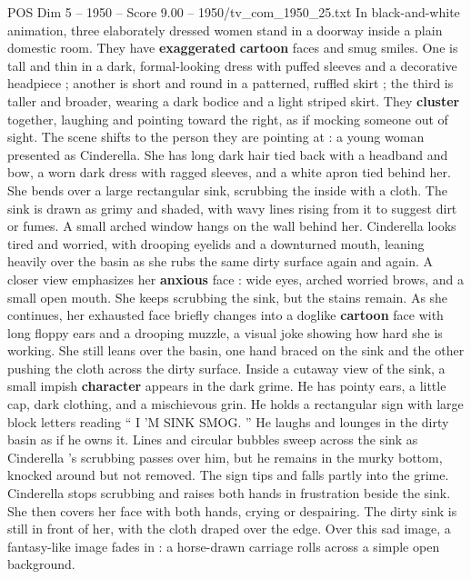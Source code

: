 \begin{textsample}{POS Dim 5 – 1950 – Score 9.00 – 1950/tv\_com\_1950\_25.txt}  \label{ex:f5_pos_071}
In black-and-white animation, three elaborately dressed women stand in a doorway inside a plain domestic room.
They have \textbf{exaggerated} \textbf{cartoon} faces and smug smiles.
One is tall and thin in a dark, formal-looking dress with puffed sleeves and a decorative headpiece ; another is short and round in a patterned, ruffled skirt ; the third is taller and broader, wearing a dark bodice and a light striped skirt.
They \textbf{cluster} together, laughing and pointing toward the right, as if mocking someone out of sight.
The scene shifts to the person they are pointing at : a young woman presented as Cinderella.
She has long dark hair tied back with a headband and bow, a worn dark dress with ragged sleeves, and a white apron tied behind her.
She bends over a large rectangular sink, scrubbing the inside with a cloth.
The sink is drawn as grimy and shaded, with wavy lines rising from it to suggest dirt or fumes.
A small arched window hangs on the wall behind her.
Cinderella looks tired and worried, with drooping eyelids and a downturned mouth, leaning heavily over the basin as she rubs the same dirty surface again and again.
A closer view emphasizes her \textbf{anxious} face : wide eyes, arched worried brows, and a small open mouth.
She keeps scrubbing the sink, but the stains remain.
As she continues, her exhausted face briefly changes into a doglike \textbf{cartoon} face with long floppy ears and a drooping muzzle, a visual joke showing how hard she is working.
She still leans over the basin, one hand braced on the sink and the other pushing the cloth across the dirty surface.
Inside a cutaway view of the sink, a small impish \textbf{character} appears in the dark grime.
He has pointy ears, a little cap, dark clothing, and a mischievous grin.
He holds a rectangular sign with large block letters reading “ I ’M SINK SMOG. ” He laughs and lounges in the dirty basin as if he owns it.
Lines and circular bubbles sweep across the sink as Cinderella ’s scrubbing passes over him, but he remains in the murky bottom, knocked around but not removed.
The sign tips and falls partly into the grime.
Cinderella stops scrubbing and raises both hands in frustration beside the sink.
She then covers her face with both hands, crying or despairing.
The dirty sink is still in front of her, with the cloth draped over the edge.
Over this sad image, a fantasy-like image fades in : a horse-drawn carriage rolls across a simple open background.

\end{textsample}
